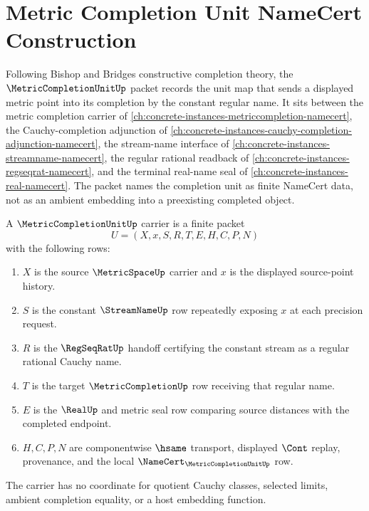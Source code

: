 \chapter{Metric Completion Unit NameCert Construction}
\label{ch:concrete-instances-metric-completion-unit-namecert}

Following Bishop and Bridges constructive completion theory, the $\MetricCompletionUnitUp$ packet records the unit map that sends a displayed metric point into its completion by the constant regular name. It sits between the metric completion carrier of \autoref{ch:concrete-instances-metriccompletion-namecert}, the Cauchy-completion adjunction of \autoref{ch:concrete-instances-cauchy-completion-adjunction-namecert}, the stream-name interface of \autoref{ch:concrete-instances-streamname-namecert}, the regular rational readback of \autoref{ch:concrete-instances-regseqrat-namecert}, and the terminal real-name seal of \autoref{ch:concrete-instances-real-namecert}. The packet names the completion unit as finite NameCert data, not as an ambient embedding into a preexisting completed object.

\begin{definition}
\label{def:metric-completion-unit-carrier}
A $\MetricCompletionUnitUp$ carrier is a finite packet
$$
U=(X,x,S,R,T,E,H,C,P,N)
$$
with the following rows:
\begin{enumerate}
\item $X$ is the source $\MetricSpaceUp$ carrier and $x$ is the displayed source-point history.
\item $S$ is the constant $\StreamNameUp$ row repeatedly exposing $x$ at each precision request.
\item $R$ is the $\RegSeqRatUp$ handoff certifying the constant stream as a regular rational Cauchy name.
\item $T$ is the target $\MetricCompletionUp$ row receiving that regular name.
\item $E$ is the $\RealUp$ and metric seal row comparing source distances with the completed endpoint.
\item $H,C,P,N$ are componentwise $\hsame$ transport, displayed $\Cont$ replay, provenance, and the local $\NameCert_{\MetricCompletionUnitUp}$ row.
\end{enumerate}
The carrier has no coordinate for quotient Cauchy classes, selected limits, ambient completion equality, or a host embedding function.
\end{definition}

